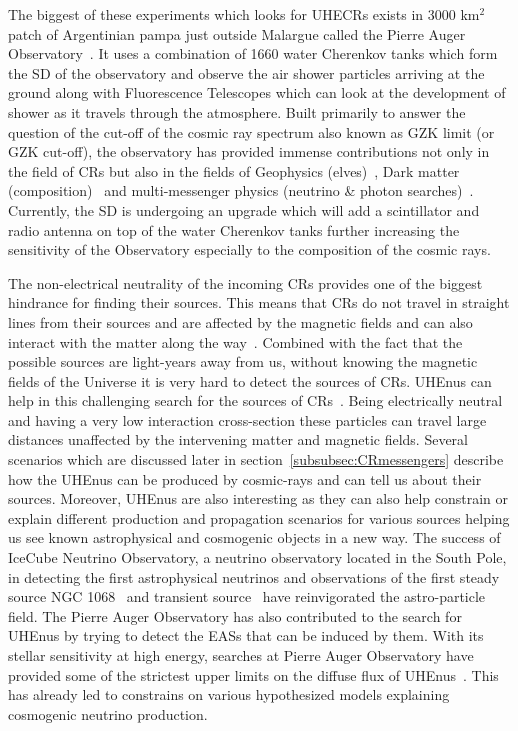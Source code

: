The biggest of these experiments which looks for \glspl{UHECR} exists in 3000 km$^2$ patch of Argentinian pampa just outside Malargue called the Pierre Auger Observatory~\cite{Auger:2015}. It uses a combination of 1660 water Cherenkov tanks which form the \gls{SD} of the observatory and observe the air shower particles arriving at the ground along with Fluorescence Telescopes which can look at the development of shower as it travels through the atmosphere. Built primarily to answer the question of the cut-off of the cosmic ray spectrum also known as \gls{GZK} limit (or GZK cut-off), the observatory has provided immense contributions not only in the field of \glspl{CR} but also in the fields of Geophysics (elves)~\cite{Mussa_2022}, Dark matter (composition)~\cite{Abreu_2023} and multi-messenger physics (neutrino \& photon searches)~\cite{Aab_2019_point,Auger_photons_2022}. Currently, the \gls{SD} is undergoing an upgrade which will add a scintillator and radio antenna on top of the water Cherenkov tanks further increasing the sensitivity of the Observatory especially to the composition of the cosmic rays.

The non-electrical neutrality of the incoming \glspl{CR} provides one of the biggest hindrance for finding their sources. This means that \glspl{CR} do not travel in straight lines from their sources and are affected by the magnetic fields and can also interact with the matter along the way~\cite{bister2024largescaleanisotropyfluxdemagnification, ALLARD201233}. Combined with the fact that the possible sources are light-years away from us, without knowing the magnetic fields of the Universe it is very hard to detect the sources of \glspl{CR}. \glspl{UHEnu} can help in this challenging search for the sources of \glspl{CR}~\cite{UHEcorrelation_2016}. Being electrically neutral and having a very low interaction cross-section these particles can travel large distances unaffected by the intervening matter and magnetic fields. Several scenarios which are discussed later in section~\ref{subsubsec:CRmessengers} describe how the \glspl{UHEnu} can be produced by cosmic-rays and can tell us about their sources. Moreover, \glspl{UHEnu} are also interesting as they can also help constrain or explain different production and propagation scenarios for various sources helping us see known astrophysical and cosmogenic objects in a new way. The success of IceCube Neutrino Observatory, a neutrino observatory located in the South Pole,  in detecting the first astrophysical neutrinos and observations of the first steady source NGC 1068~\cite{Icecube_2022} and transient source~\cite{Icecube_txs} have reinvigorated the astro-particle field. The Pierre Auger Observatory has also contributed to the search for \glspl{UHEnu} by trying to detect the \glspl{EAS} that can be induced by them. With its stellar sensitivity at high energy, searches at Pierre Auger Observatory have provided some of the strictest upper limits on the diffuse flux of \glspl{UHEnu}~\cite{Aab_2019_diffuse}. This has already led to constrains on various hypothesized models explaining cosmogenic neutrino production.


